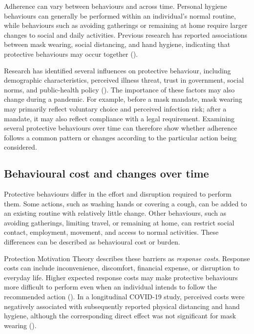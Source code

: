 \documentclass[
  12pt,
  a4paper,
]{article}
\begin{document}
Adherence can vary between behaviours and across time. Personal hygiene
behaviours can generally be performed within an individual's normal
routine, while behaviours such as avoiding gatherings or remaining at
home require larger changes to social and daily activities. Previous
research has reported associations between mask wearing, social
distancing, and hand hygiene, indicating that protective behaviours may
occur together ().

Research has identified several influences on protective behaviour,
including demographic characteristics, perceived illness threat, trust
in government, social norms, and public-health policy (). The importance of these factors may also change during a
pandemic. For example, before a mask mandate, mask wearing may primarily
reflect voluntary choice and perceived infection risk; after a mandate,
it may also reflect compliance with a legal requirement. Examining
several protective behaviours over time can therefore show whether
adherence follows a common pattern or changes according to the
particular action being considered.

\subsection{Behavioural cost and changes over time}\label{behavioural-cost-and-changes-over-time}

Protective behaviours differ in the effort and disruption required to
perform them. Some actions, such as washing hands or covering a cough,
can be added to an existing routine with relatively little change. Other
behaviours, such as avoiding gatherings, limiting travel, or remaining
at home, can restrict social contact, employment, movement, and access
to normal activities. These differences can be described as behavioural
cost or burden.

Protection Motivation Theory describes these barriers as \emph{response
costs}. Response costs can include inconvenience, discomfort, financial
expense, or disruption to everyday life. Higher expected response costs
may make protective behaviours more difficult to perform even when an
individual intends to follow the recommended action (). In a longitudinal COVID-19 study, perceived costs were
negatively associated with subsequently reported physical distancing and
hand hygiene, although the corresponding direct effect was not
significant for mask wearing ().
\end{document}
